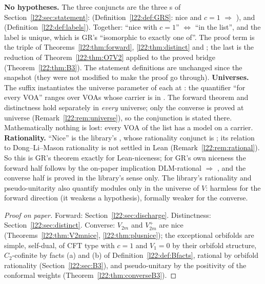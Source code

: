 \begin{dictionary}
\textbf{No hypotheses.} The three conjuncts are the three s of Section~\ref{l22:sec:statement}:
 (Definition~\ref{l22:def:GRS}: nice and $c=1$ $\Rightarrow$ ),
 and  (Definition~\ref{l22:def:labels}). Together: ``nice with
$c=1$'' $\iff$ ``in the list'', and the label is unique, which is GR's ``isomorphic to exactly one of''. The proof term is
the triple of Theorems~\ref{l22:thm:forward}, \ref{l22:thm:distinct} and ; the last
is the reduction of Theorem~\ref{l22:thm:O7V2} applied to the proved bridge (Theorem~\ref{l22:thm:B3}). The statement
definitions are unchanged since the snapshot (they were not modified to make the proof go through).
\textbf{Universes.} The suffix  instantiates the universe parameter of each  at : the
quantifier ``for every VOA'' ranges over VOAs whose carrier is in . The forward theorem
 and distinctness
 hold separately in \emph{every} universe; only the converse is
proved at universe  (Remark~\ref{l22:rem:universe}), so the conjunction is stated there. Mathematically nothing
is lost: every VOA of the list has a model on a  carrier.
\textbf{Rationality.} ``Nice'' is the library's , whose rationality conjunct is ; its
relation to Dong--Li--Mason rationality is not settled in Lean (Remark~\ref{l22:rem:rational}). So this is GR's theorem
exactly for Lean-niceness; for GR's own niceness the forward half follows by the on-paper implication DLM-rational
$\Rightarrow$ , and the converse half is proved in the library's sense only. The library's
rationality and pseudo-unitarity also quantify modules only in the universe of $V$: harmless for the forward direction
(it weakens a hypothesis), formally weaker for the converse.
\end{dictionary}

\begin{proof}[Proof on paper]
Forward: Section~\ref{l22:sec:discharge}. Distinctness: Section~\ref{l22:sec:distinct}. Converse: $V_{2m}$ and
$V_{2m}^+$ are nice (Theorems~\ref{l22:thm:V2mnice}, \ref{l22:thm:plusnice}); the exceptional orbifolds are simple,
self-dual, of CFT type with $c=1$ and $V_1=0$ by their orbifold structure, $C_2$-cofinite by facts (a) and (b) of Definition~\ref{l22:def:Bfacts},
rational by orbifold rationality (Section~\ref{l22:sec:B3}), and pseudo-unitary by the positivity of the conformal
weights (Theorem~\ref{l22:thm:converseB3}).
\end{proof}

